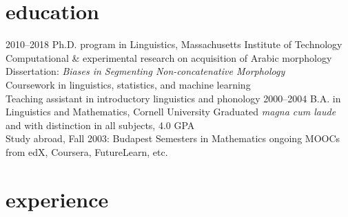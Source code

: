 \documentclass[]{friggeri-cv}
\begin{document}


\section{education}

\begin{entrylist}
  \entry
    {2010--2018}
    {Ph.D. program in Linguistics, Massachusetts Institute of Technology}
    {}
    {
     \Squaredot Computational \& experimental research on acquisition of Arabic morphology \\
     \Squaredot Dissertation: {\it Biases in Segmenting Non-concatenative Morphology} \\
     \Squaredot Coursework in linguistics, statistics, and machine learning\\
     \Squaredot Teaching assistant in introductory linguistics and phonology
    }
  \entry
    {2000--2004}
    {B.A. in Linguistics and Mathematics, Cornell University}
    {}
    {
    \Squaredot Graduated \emph{magna cum laude} and with distinction in all subjects, 4.0 GPA \\
	\Squaredot Study abroad, Fall 2003: Budapest Semesters in Mathematics}
  \entry
    {ongoing}
    {MOOCs from edX, Coursera, FutureLearn, etc.}
    {}
    {}
\end{entrylist}

\section{experience}
\end{document}
